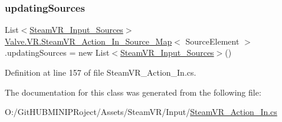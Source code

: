 \subsubsection{\texorpdfstring{updatingSources}{updatingSources}}
{\footnotesize\ttfamily List$<$\mbox{\hyperlink{namespace_valve_1_1_v_r_a82e5bf501cc3aa155444ee3f0662853f}{Steam\+V\+R\+\_\+\+Input\+\_\+\+Sources}}$>$ \mbox{\hyperlink{class_valve_1_1_v_r_1_1_steam_v_r___action___in___source___map}{Valve.\+V\+R.\+Steam\+V\+R\+\_\+\+Action\+\_\+\+In\+\_\+\+Source\+\_\+\+Map}}$<$ Source\+Element $>$.updating\+Sources = new List$<$\mbox{\hyperlink{namespace_valve_1_1_v_r_a82e5bf501cc3aa155444ee3f0662853f}{Steam\+V\+R\+\_\+\+Input\+\_\+\+Sources}}$>$()\hspace{0.3cm}{\ttfamily [protected]}}



Definition at line 157 of file Steam\+V\+R\+\_\+\+Action\+\_\+\+In.\+cs.



The documentation for this class was generated from the following file\+:\begin{DoxyCompactItemize}
\item 
O\+:/\+Git\+H\+U\+B\+M\+I\+N\+I\+P\+Roject/\+Assets/\+Steam\+V\+R/\+Input/\mbox{\hyperlink{_steam_v_r___action___in_8cs}{Steam\+V\+R\+\_\+\+Action\+\_\+\+In.\+cs}}\end{DoxyCompactItemize}
